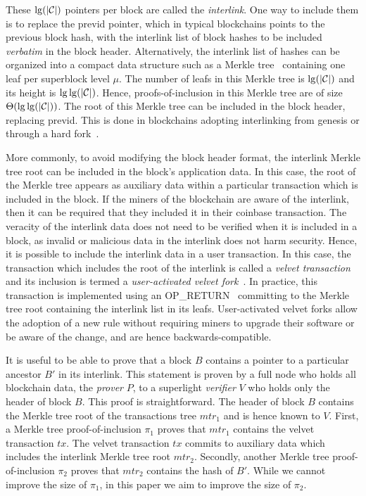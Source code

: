 These $\lg(|\mathcal{C}|)$ pointers per block are called the \emph{interlink}.
One way to include them is to replace the \textsf{previd} pointer, which in
typical blockchains points to the previous block hash, with the interlink list
of block hashes to be included \emph{verbatim} in the block header.
Alternatively, the interlink list of hashes can be
organized into a compact data structure such as a Merkle tree~\cite{merkletree}
containing one leaf per superblock level $\mu$. The number
of leafs in this Merkle tree is $\lg(|\mathcal{C}|)$ and its height is
$\lg\lg(|\mathcal{C}|)$. Hence,
proofs-of-inclusion in this Merkle tree are of size
$\Theta(\lg\lg(|\mathcal{C}|))$. The root of this Merkle tree can be included in the
block header, replacing \textsf{previd}. This is done in blockchains adopting
interlinking from genesis or through a hard fork~\cite{nimiq,ergo}.

More commonly, to avoid modifying the block header format, the interlink Merkle
tree root can be included in the block's application data. In this case, the
root of the Merkle tree appears as auxiliary data within a particular transaction
which is included in the block. If the miners of the blockchain are aware of the
interlink, then it can be required that they included it in their coinbase
transaction. The veracity of the interlink data does not need to be verified
when it is included in a block, as invalid or malicious data in the interlink
does not harm security. Hence, it is possible to include the interlink data in a user
transaction. In this case, the transaction which includes the root of the
interlink is called a \emph{velvet transaction} and its inclusion is termed a
\emph{user-activated velvet fork}~\cite{gtklocker}. In practice, this
transaction is implemented using an
\textsf{OP\_RETURN}~\cite{bartoletti2017analysis} committing to the Merkle tree
root containing the interlink list in its leafs. User-activated velvet forks
allow the adoption of a new rule without requiring miners to upgrade their
software or be aware of the change, and are hence backwards-compatible.

It is useful to be able to prove that a block $B$ contains a pointer to a
particular ancestor $B'$ in its interlink. This statement is proven by a full
node who holds all blockchain data, the \emph{prover} $P$, to a superlight
\emph{verifier} $V$ who holds only the header of block $B$. This proof is
straightforward. The header of block $B$ contains the Merkle tree root of the
transactions tree $mtr_1$ and is hence known to $V$. First, a Merkle
tree proof-of-inclusion $\pi_1$ proves that $mtr_1$ contains the velvet transaction
$tx$. The velvet transaction $tx$ commits to auxiliary data which includes the
interlink Merkle tree root $mtr_2$.
Secondly, another Merkle tree proof-of-inclusion $\pi_2$ proves that $mtr_2$
contains the hash of $B'$. While we cannot improve the size of $\pi_1$, in this
paper we aim to improve the size of $\pi_2$.

